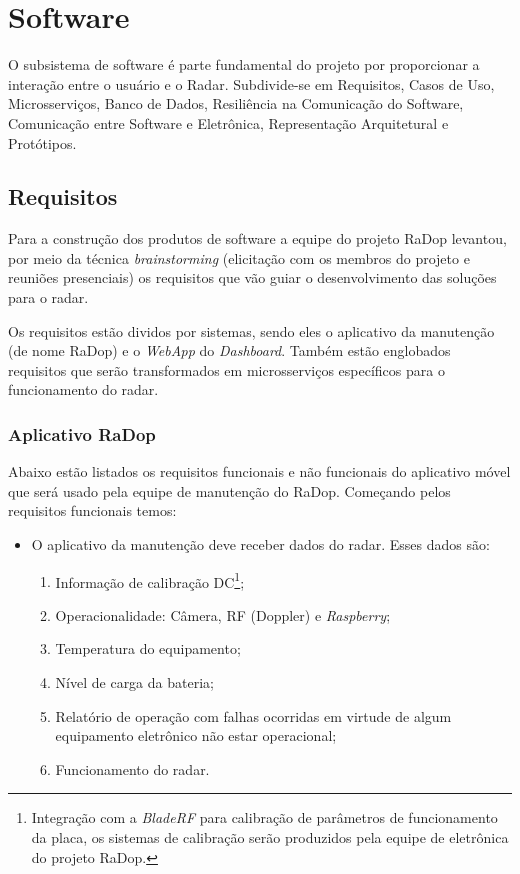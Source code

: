 \chapter{Software}


O subsistema de software é parte fundamental do projeto por proporcionar a interação entre o usuário e o Radar. Subdivide-se em Requisitos, Casos de Uso, Microsserviços, Banco de Dados, Resiliência na Comunicação do Software, Comunicação entre Software e Eletrônica, Representação Arquitetural e Protótipos. 

\section{Requisitos}\nopagebreak

Para a construção dos produtos de software a equipe do projeto RaDop levantou, por meio da técnica \textit{brainstorming} (elicitação com os membros do projeto e reuniões presenciais) os requisitos que vão guiar o desenvolvimento das soluções para o radar.

Os requisitos estão dividos por sistemas, sendo eles o aplicativo da manutenção (de nome RaDop) e o \textit{WebApp} do \textit{Dashboard}. Também estão englobados requisitos que serão transformados em microsserviços específicos para o funcionamento do radar.

\subsection{Aplicativo RaDop}

Abaixo estão listados os requisitos funcionais e não funcionais do aplicativo móvel que será usado pela equipe de manutenção do RaDop. Começando pelos requisitos funcionais temos:


\begin{itemize}
  \item O aplicativo da manutenção deve receber dados do radar. Esses dados são:
  \begin{enumerate}
    \item Informação de calibração DC\footnote{Integração com a \textit{BladeRF} para calibração de parâmetros de funcionamento da placa, os sistemas de calibração serão produzidos pela equipe de eletrônica do projeto RaDop.};
    \item Operacionalidade: Câmera, RF (Doppler) e \textit{Raspberry};
    \item Temperatura do equipamento;
    \item Nível de carga da bateria;
    \item Relatório de operação com falhas ocorridas em virtude de algum equipamento eletrônico não estar operacional;
    \item Funcionamento do radar.
  \end{enumerate}
\end{itemize}

